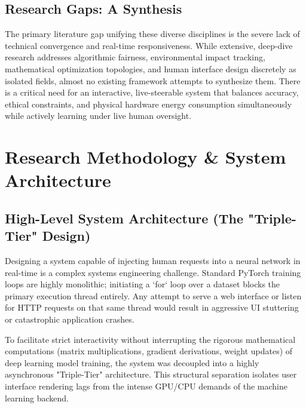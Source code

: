 \documentclass[12pt,a4paper]{article}
\begin{document}
\subsection{Research Gaps: A Synthesis}
The primary literature gap unifying these diverse disciplines is the severe lack of technical convergence and real-time responsiveness. While extensive, deep-dive research addresses algorithmic fairness, environmental impact tracking, mathematical optimization topologies, and human interface design discretely as isolated fields, almost no existing framework attempts to synthesize them. There is a critical need for an interactive, live-steerable system that balances accuracy, ethical constraints, and physical hardware energy consumption simultaneously while actively learning under live human oversight.

\section{Research Methodology \& System Architecture}

\subsection{High-Level System Architecture (The "Triple-Tier" Design)}
Designing a system capable of injecting human requests into a neural network in real-time is a complex systems engineering challenge. Standard PyTorch training loops are highly monolithic; initiating a `for` loop over a dataset blocks the primary execution thread entirely. Any attempt to serve a web interface or listen for HTTP requests on that same thread would result in aggressive UI stuttering or catastrophic application crashes.

To facilitate strict interactivity without interrupting the rigorous mathematical computations (matrix multiplications, gradient derivations, weight updates) of deep learning model training, the system was decoupled into a highly asynchronous "Triple-Tier" architecture. This structural separation isolates user interface rendering lags from the intense GPU/CPU demands of the machine learning backend.
\end{document}
